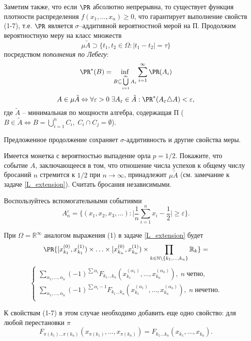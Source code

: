 \begin{remark}
Заметим также, что если $\PR$ абсолютно непрерывна, то существует функция плотности распределения  $f(x_1 ,\ldots, x_n ) \geq 0$, что гарантирует выполнение свойств (1-7), т.е. $\PR$ является  $\sigma$–аддитивной вероятностной мерой на  $\text{П}$.
Продолжим вероятностную меру на класс множеств 
\[\mu \tilde{A} \supset \{t_1, t_2 \in \Omega: |t_1 - t_2| =\tau \}\]
посредством \textit{пополнения по Лебегу}:
\[
\PR^{*}(B) = \inf \limits_{B \subseteq \bigcup \limits_{i=1}^{\infty} A_i} \sum \limits_{i=1}^{\infty} \PR(A_i)
\]
 \[
 A \in \mu \tilde{A} \Leftrightarrow  \forall \varepsilon >0 \; \exists A_\varepsilon \in \tilde{A}:  \PR^{*}(A_\varepsilon \triangle A) < \varepsilon,
 \] 
где $\tilde{A}$ --  минимальная по мощности алгебра, содержащая $\text{П}$ ($B \in \tilde{A} \Leftrightarrow B = \bigcup \limits_{i=1}^n C_i, \; C_i \cap C_j  = \emptyset$).

Предложенное продолжение сохраняет $\sigma$-аддитивность и другие свойства меры.  

\end{remark}

\begin{problem}
Имеется монетка с вероятностью выпадение орла $p=1/2$. Покажите, что событие $A$, заключающееся в том, что отношение числа успехов к
общему числу бросаний $n$ стремится к $1/2$ при $n \to \infty$, принадлежит $\mu \tilde{A}$ (см. замечание к задаче \ref{L_extension}). Считать бросания независимыми.
\end{problem}

\begin{ordre}
Воспользуйтесь вспомогательными событиями 
\[
A_n^\varepsilon = \Bigg\{ (x_1, x_2, x_3, \ldots):\Bigg| \frac{1}{n}\sum \limits_{i=1}^n x_i -\frac{1}{2} \Bigg| \geq \varepsilon \Bigg\}.
\]
\end{ordre}

\begin{remark}
При $\Omega = \mathbb{R}^\infty$ аналогом выражения (1) в задаче \ref{L_extension} будет
\[
\PR\{ [x_{k_1}^{(0)}, x_{k_1}^{(1)})\times \ldots \times [x_{k_n}^{(0)},  x_{k_n}^{(1)} )\times \prod \limits_{k \in \mathbb{N} \setminus \{k_1, \ldots, k_n\} }  \mathbb{R}_k  \} = 
\]
\[
\begin{cases}
\sum \limits_{\alpha_1, \ldots, \alpha_n} (-1)^{\sum \alpha_i} F_{k_1 \ldots k_n}\left(x_{k_1}^{(\alpha_1)} ,\ldots, x_{k_n}^{(\alpha_n)} \right) ,  \; n \; \text{четно}, \\
\sum \limits_{\alpha_1, \ldots, \alpha_n} (-1)^{\sum \alpha_i - 1} F_{k_1 \ldots k_n}\left( x_{k_1}^{(\alpha_1)} ,\ldots, x_{k_n}^{(\alpha_n)} \right)  ,  \; n \; \text{нечетно}.\\
\end{cases}
\]

К свойствам (1-7) в этом случае необходимо добавить еще одно свойство:
 для любой перестановки  $\pi$ 
\[
 F_{\pi(k_1) \ldots \pi(k_n)} \left(x_{\pi(k_1)} ,\ldots, x_{\pi(k_n)} \right) =  F_{k_1 \ldots k_n}\left(x_{k_1} ,\ldots, x_{k_n}\right). 
\]

\end{remark}


